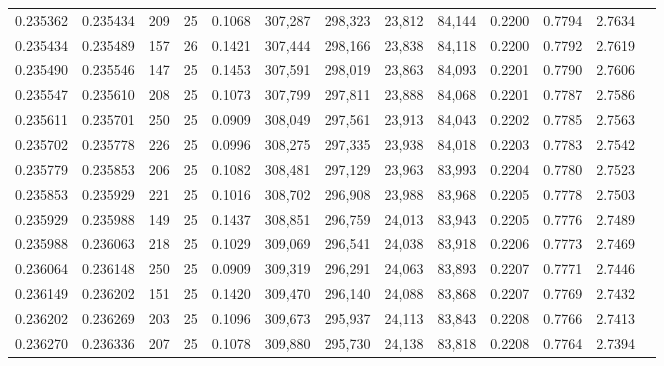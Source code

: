 \begin{tabular}{rrrrrrrrrrrrr}
0.235362 & 0.235434 &   209 &  25 &                                     0.1068 & 307,287 & 298,323 &  23,812 &  84,144 & 0.2200 & 0.7794 & 2.7634 \\
0.235434 & 0.235489 &   157 &  26 &                                     0.1421 & 307,444 & 298,166 &  23,838 &  84,118 & 0.2200 & 0.7792 & 2.7619 \\
0.235490 & 0.235546 &   147 &  25 &                                     0.1453 & 307,591 & 298,019 &  23,863 &  84,093 & 0.2201 & 0.7790 & 2.7606 \\
0.235547 & 0.235610 &   208 &  25 &                                     0.1073 & 307,799 & 297,811 &  23,888 &  84,068 & 0.2201 & 0.7787 & 2.7586 \\
0.235611 & 0.235701 &   250 &  25 &                                     0.0909 & 308,049 & 297,561 &  23,913 &  84,043 & 0.2202 & 0.7785 & 2.7563 \\
0.235702 & 0.235778 &   226 &  25 &                                     0.0996 & 308,275 & 297,335 &  23,938 &  84,018 & 0.2203 & 0.7783 & 2.7542 \\
0.235779 & 0.235853 &   206 &  25 &                                     0.1082 & 308,481 & 297,129 &  23,963 &  83,993 & 0.2204 & 0.7780 & 2.7523 \\
0.235853 & 0.235929 &   221 &  25 &                                     0.1016 & 308,702 & 296,908 &  23,988 &  83,968 & 0.2205 & 0.7778 & 2.7503 \\
0.235929 & 0.235988 &   149 &  25 &                                     0.1437 & 308,851 & 296,759 &  24,013 &  83,943 & 0.2205 & 0.7776 & 2.7489 \\
0.235988 & 0.236063 &   218 &  25 &                                     0.1029 & 309,069 & 296,541 &  24,038 &  83,918 & 0.2206 & 0.7773 & 2.7469 \\
0.236064 & 0.236148 &   250 &  25 &                                     0.0909 & 309,319 & 296,291 &  24,063 &  83,893 & 0.2207 & 0.7771 & 2.7446 \\
0.236149 & 0.236202 &   151 &  25 &                                     0.1420 & 309,470 & 296,140 &  24,088 &  83,868 & 0.2207 & 0.7769 & 2.7432 \\
0.236202 & 0.236269 &   203 &  25 &                                     0.1096 & 309,673 & 295,937 &  24,113 &  83,843 & 0.2208 & 0.7766 & 2.7413 \\
0.236270 & 0.236336 &   207 &  25 &                                     0.1078 & 309,880 & 295,730 &  24,138 &  83,818 & 0.2208 & 0.7764 & 2.7394 \\

\end{tabular}
